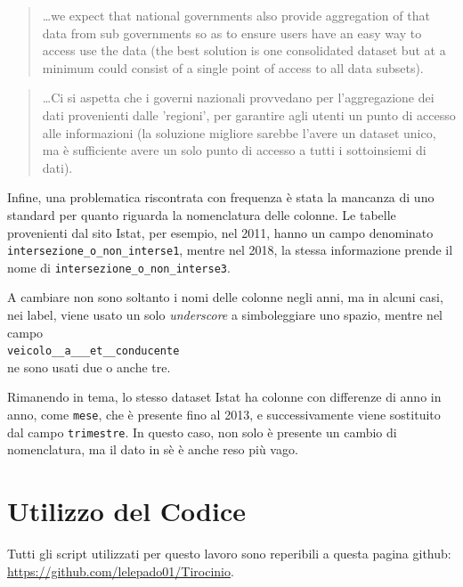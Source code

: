\documentclass[a4paper,12pt]{report}
\newcommand{\columnstyle}[1]{\texttt{#1}}
\newcommand{\quotestyle}[1]{\textit{#1}}
\newcommand{\skipline}{\vspace{0.2in}}
\begin{document}
\begin{quotation}
    \dots we expect that national governments also provide aggregation 
    of that data from 
    sub governments so as to ensure users have an easy way to access use the data 
    (the best solution is one consolidated dataset but at a minimum could consist of a 
    single point of access to all data subsets).\cite{OPENDATAINDEX:1}
\end{quotation}

\begin{quotation}
    \dots Ci si aspetta che i governi nazionali provvedano per 
    l'aggregazione dei dati provenienti dalle 'regioni', per garantire agli utenti 
    un punto di accesso 
    alle informazioni (la soluzione migliore sarebbe l'avere un dataset unico, ma è sufficiente 
    avere un solo punto di accesso a tutti i sottoinsiemi di dati). 
\end{quotation}

\skipline
Infine, una problematica riscontrata con frequenza è stata la mancanza 
di uno standard per quanto riguarda la nomenclatura delle colonne. 
Le tabelle provenienti dal sito Istat, per esempio, nel 2011, hanno un campo denominato 
\columnstyle{intersezione\_o\_non\_interse1}, 
mentre nel 2018, la stessa informazione prende il nome di 
\columnstyle{intersezione\_o\_non\_interse3}.

A cambiare non sono soltanto i nomi delle colonne negli anni, 
ma in alcuni casi, nei label, viene usato un solo \quotestyle{underscore} a 
simboleggiare uno spazio, mentre nel campo\\
\indent\columnstyle{veicolo\_\_a\_\_\_et\_\_conducente}\\
ne sono usati due o anche tre. 

Rimanendo in tema, lo stesso dataset Istat ha colonne con differenze di anno in anno, 
come \columnstyle{mese}, che è presente fino al 2013, e successivamente viene 
sostituito dal campo \columnstyle{trimestre}. 
In questo caso, non solo è presente un cambio di nomenclatura, ma il dato in sè è 
anche reso più vago. 

\chapter{Utilizzo del Codice}

Tutti gli script utilizzati per questo lavoro sono reperibili a questa pagina 
github: \url{https://github.com/lelepado01/Tirocinio}. 
\end{document}
